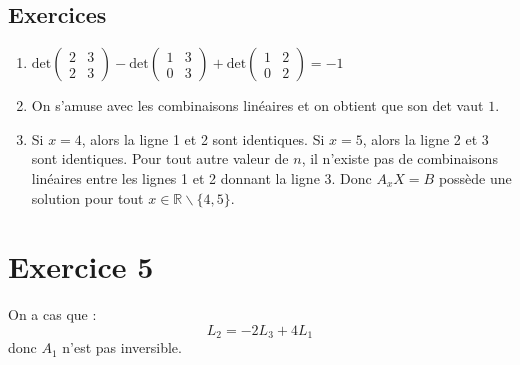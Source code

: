 \documentclass[a4paper, titlepage]{article}
\begin{document}
	\subsection*{Exercices}
	\begin{enumerate}
		\item $\mathrm{det}\begin{pmatrix} 2&3\\2&3 \end{pmatrix} - \mathrm{det}\begin{pmatrix} 1&3\\0&3 \end{pmatrix} + \mathrm{det}\begin{pmatrix} 1&2\\0&2 \end{pmatrix} = -1$
		\item On s'amuse avec les combinaisons linéaires et on obtient que son $\mathrm{det}$ vaut $1$.
		\item Si $x=4$, alors la ligne 1 et 2 sont identiques. Si $x=5$, alors la ligne 2 et 3 sont identiques. Pour tout autre valeur de $n$, il n'existe pas de combinaisons linéaires entre les lignes 1 et 2 donnant la ligne 3. Donc $A_xX=B$ possède une solution pour tout $x\in\mathbb{R}\backslash\{4, 5\}$.
	\end{enumerate}
	\section*{Exercice 5}
	On a cas que :
	$$ L_2 = -2L_3+4L_1 $$
	donc $A_1$ n'est pas inversible.
\end{document}

